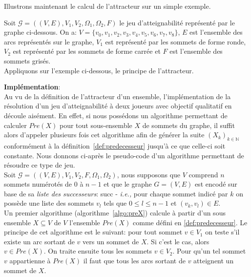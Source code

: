 Illustrons maintenant le calcul de l'attracteur sur un simple exemple.

\begin{exemple}
Soit $\mathcal{G} = ((V,E),V_{1},V_{2},\Omega _{1}, \Omega _{2},F)$ le jeu d'atteignabilité représenté par le graphe ci-dessous. On a: $V = \{ v_{0},v_{1},v_{2},v_{3},v_{4},v_{5},v_{6},v_{7},v_{8} \}$, $E$ est l'ensemble des arcs représentés sur le graphe, $V_{1}$ est représenté par les sommets de forme ronde, $V_{2}$ est représenté par les sommets de forme carrée et $F$ est l'ensemble des sommets grisés.\\
Appliquons sur l'exemple ci-dessous, le principe de l'attracteur.


\FloatBarrier
\end{exemple}

\noindent\textbf{Implémentation}:\\

Au vu de la définition de l'attracteur d'un ensemble, l'implémentation de la résolution d'un jeu d'atteignabilité à deux joueurs avec objectif qualitatif en découle aisément. En effet, si nous possédons un algorithme permettant de calculer $Pre(X)$ pour tout sous-ensemble $X$ de sommets du graphe, il suffit alors d'appeler plusieurs fois cet algorithme afin de générer la suite $(X_k)_{k \in \mathbb{N}}$ conformément à la définition~\ref{def:predecesseur} jusqu'à ce que celle-ci soit constante. Nous donnons ci-après le pseudo-code d'un algorithme permettant de résoudre ce type de jeu. \\

Soit $\mathcal{G} = ((V,E),V_{1},V_{2}, F, \Omega _{1}, \Omega _{2})$, nous supposons que $V$ comprend $n$ sommets numérotés de $0$ à $n-1$ et que le graphe $G = (V,E)$ est encodé sur base de sa \textit{liste des successeurs}: succ - \emph{i.e.,} pour chaque sommet indicé par $k$ on possède une liste des sommets $v_l$ tels que $0 \leq l \leq n-1$ et $(v_k, v_l) \in E$.\\

Un premier algorithme (algorithme~\ref{algo:preX}) calcule à partir d'un sous ensemble $X \subseteq V$ de $V$ l'ensemble $Pre(X)$ comme défini en \ref{def:predecesseur}. Le principe de cet algorithme est le suivant: pour tout sommet $v\in V_{1}$ on teste s'il existe un arc sortant de $v$ vers un sommet de $X$. Si c'est le cas, alors $v\in Pre(X)$. On traite ensuite tous les sommets $v \in V_{2}$. Pour qu'un tel sommet $v$ appartienne à $Pre(X)$ il faut que tous les arcs sortant de $v$ atteignent un sommet de $X$.

